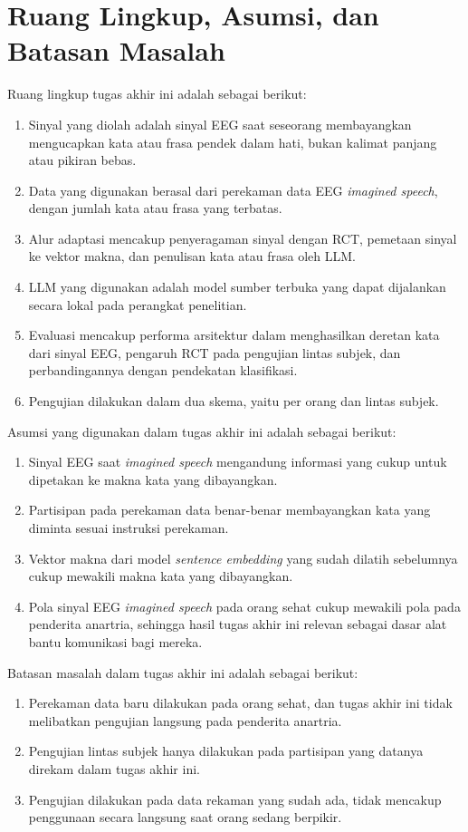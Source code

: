 \section{Ruang Lingkup, Asumsi, dan Batasan Masalah}
\label{sec:ruang-lingkup}
Ruang lingkup tugas akhir ini adalah sebagai berikut:
\begin{enumerate}
    \item Sinyal yang diolah adalah sinyal EEG saat seseorang membayangkan mengucapkan kata atau frasa pendek dalam hati, bukan kalimat panjang atau pikiran bebas.
    \item Data yang digunakan berasal dari perekaman data EEG \textit{imagined speech}, dengan jumlah kata atau frasa yang terbatas.
    \item Alur adaptasi mencakup penyeragaman sinyal dengan RCT, pemetaan sinyal ke vektor makna, dan penulisan kata atau frasa oleh LLM.
    \item LLM yang digunakan adalah model sumber terbuka yang dapat dijalankan secara lokal pada perangkat penelitian.
    \item Evaluasi mencakup performa arsitektur dalam menghasilkan deretan kata dari sinyal EEG, pengaruh RCT pada pengujian lintas subjek, dan perbandingannya dengan pendekatan klasifikasi.
    \item Pengujian dilakukan dalam dua skema, yaitu per orang dan lintas subjek.
\end{enumerate}

Asumsi yang digunakan dalam tugas akhir ini adalah sebagai berikut:
\begin{enumerate}
    \item Sinyal EEG saat \textit{imagined speech} mengandung informasi yang cukup untuk dipetakan ke makna kata yang dibayangkan.
    \item Partisipan pada perekaman data benar-benar membayangkan kata yang diminta sesuai instruksi perekaman.
    \item Vektor makna dari model \textit{sentence embedding} yang sudah dilatih sebelumnya cukup mewakili makna kata yang dibayangkan.
    \item Pola sinyal EEG \textit{imagined speech} pada orang sehat cukup mewakili pola pada penderita anartria, sehingga hasil tugas akhir ini relevan sebagai dasar alat bantu komunikasi bagi mereka.
\end{enumerate}

Batasan masalah dalam tugas akhir ini adalah sebagai berikut:
\begin{enumerate}
    \item Perekaman data baru dilakukan pada orang sehat, dan tugas akhir ini tidak melibatkan pengujian langsung pada penderita anartria.
    \item Pengujian lintas subjek hanya dilakukan pada partisipan yang datanya direkam dalam tugas akhir ini.
    \item Pengujian dilakukan pada data rekaman yang sudah ada, tidak mencakup penggunaan secara langsung saat orang sedang berpikir.
\end{enumerate}


